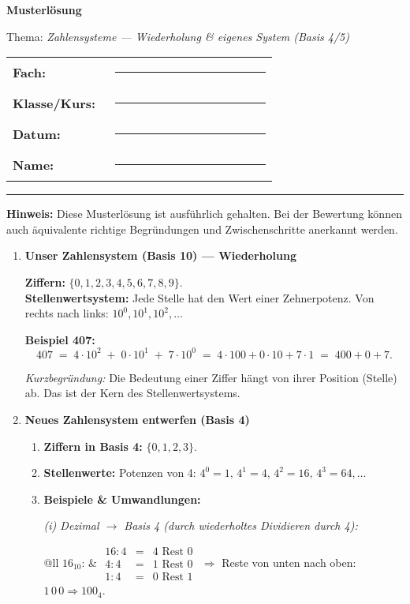 \documentclass[11pt,a4paper]{scrartcl}
\newcommand{\blatttyp}{Musterlösung}
\newcommand{\thema}{\textit{Zahlensysteme — Wiederholung \& eigenes System (Basis 4/5)}}
\newcommand{\sheettitle}[2]{%
	\begin{minipage}[t]{0.62\linewidth}
		\vspace{0.6em}
		{\Large\bfseries #1}\par\vspace{-0.2em}
		{\normalsize #2}
	\end{minipage}\hfill
	\begin{minipage}[t]{0.35\linewidth}
		\renewcommand{\arraystretch}{1.2}
		\begin{tabular}{>{\bfseries}p{0.36\linewidth}p{0.58\linewidth}}
			Fach: & \rule{3.8cm}{0.4pt} \\
			Klasse/Kurs: & \rule{3.8cm}{0.4pt} \\
			Datum: & \rule{3.8cm}{0.4pt} \\
			Name: & \rule{3.8cm}{0.4pt} \\
		\end{tabular}
	\end{minipage}
	\vspace{0.8em}\par\hrule\vspace{1.0em}
}
\newenvironment{loesungen}{%
	\begin{enumerate}[leftmargin=*,label=\textbf{Lösung~\arabic*:}]
	}{\end{enumerate}}
\newenvironment{schritte}{%
	\begin{enumerate}[leftmargin=*,label=\alph*)]
	}{\end{enumerate}}
\begin{document}
	
	\sheettitle{\blatttyp}{Thema: \thema}
	
	\textbf{Hinweis:} Diese Musterlösung ist ausführlich gehalten. Bei der Bewertung können auch äquivalente richtige Begründungen und Zwischenschritte anerkannt werden.
	
	\begin{loesungen}
		
		\item \textbf{Unser Zahlensystem (Basis 10) — Wiederholung}
		
		\textbf{Ziffern:} \(\{0,1,2,3,4,5,6,7,8,9\}\).\\
		\textbf{Stellenwertsystem:} Jede Stelle hat den Wert einer Zehnerpotenz. Von rechts nach links: \(10^0,10^1,10^2,\dots\)
		
		\textbf{Beispiel 407:}
		\[
		407 \;=\; 4\cdot 10^2 \;+\; 0\cdot 10^1 \;+\; 7\cdot 10^0
		\;=\; 4\cdot 100 + 0\cdot 10 + 7\cdot 1
		\;=\; 400 + 0 + 7.
		\]
		
		\emph{Kurzbegründung:} Die Bedeutung einer Ziffer hängt von ihrer Position (Stelle) ab. Das ist der Kern des Stellenwertsystems.
		
		\vspace{0.6em}
		
		\item \textbf{Neues Zahlensystem entwerfen (Basis 4)}
		
		\begin{schritte}
			\item \textbf{Ziffern in Basis 4:} \(\{0,1,2,3\}\).
			
			\item \textbf{Stellenwerte:} Potenzen von 4: \(4^0=1,\,4^1=4,\,4^2=16,\,4^3=64,\dots\)
			
			\item \textbf{Beispiele \& Umwandlungen:}
			
			\textit{(i) Dezimal \(\to\) Basis 4 (durch wiederholtes Dividieren durch 4):}
			
			\begin{tabular}{@{}ll}
				\(16_{10}\): &
				\(\begin{array}{rcl}
					16 : 4 &=& 4 \text{ Rest } 0 \\
					4 : 4 &=& 1 \text{ Rest } 0 \\
					1 : 4 &=& 0 \text{ Rest } 1
				\end{array}\)
				\(\Rightarrow\) Reste von unten nach oben: \(1\,0\,0 \Rightarrow 100_4\).
			\end{tabular}
			

\end{schritte}
\end{loesungen}
\end{document}
